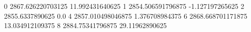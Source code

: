 0 2867.626220703125 11.992431640625
1 2854.506591796875 -1.127197265625
2 2855.6337890625 0.0
4 2857.010498046875 1.376708984375
6 2868.668701171875 13.034912109375
8 2884.75341796875 29.11962890625
